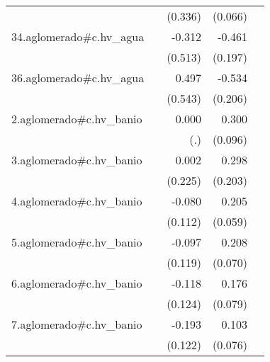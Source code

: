 {\begin{longtable}{l*{4}{D{.}{.}{-1}}}
            &                     &     (0.336)         &     (0.066)         &                     \\
\addlinespace
34.aglomerado#c.hv\_agua&                     &      -0.312         &      -0.461\sym{*}  &                     \\
            &                     &     (0.513)         &     (0.197)         &                     \\
\addlinespace
36.aglomerado#c.hv\_agua&                     &       0.497         &      -0.534\sym{**} &                     \\
            &                     &     (0.543)         &     (0.206)         &                     \\
\addlinespace
2.aglomerado#c.hv\_banio&                     &       0.000         &       0.300\sym{**} &                     \\
            &                     &         (.)         &     (0.096)         &                     \\
\addlinespace
3.aglomerado#c.hv\_banio&                     &       0.002         &       0.298         &                     \\
            &                     &     (0.225)         &     (0.203)         &                     \\
\addlinespace
4.aglomerado#c.hv\_banio&                     &      -0.080         &       0.205\sym{***}&                     \\
            &                     &     (0.112)         &     (0.059)         &                     \\
\addlinespace
5.aglomerado#c.hv\_banio&                     &      -0.097         &       0.208\sym{**} &                     \\
            &                     &     (0.119)         &     (0.070)         &                     \\
\addlinespace
6.aglomerado#c.hv\_banio&                     &      -0.118         &       0.176\sym{*}  &                     \\
            &                     &     (0.124)         &     (0.079)         &                     \\
\addlinespace
7.aglomerado#c.hv\_banio&                     &      -0.193         &       0.103         &                     \\
            &                     &     (0.122)         &     (0.076)         &                     \\

\end{longtable}}
